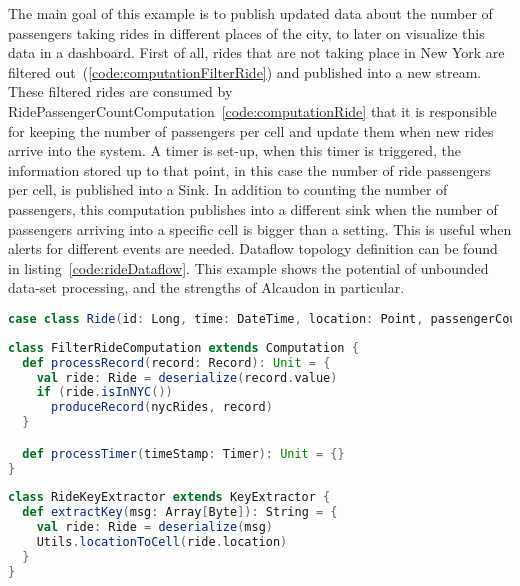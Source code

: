 The main goal of this example is to publish updated data about the number of
passengers taking rides in different places of the city, to later on visualize
this data in a dashboard. First of all, rides that are not taking place in New
York are filtered out~(\ref{code:computationFilterRide}) and published into a new
stream. These filtered rides are consumed by
RidePassengerCountComputation~\ref{code:computationRide} that it is responsible
for keeping the number of passengers per cell and update them when new rides
arrive into the system. A timer is set-up, when this timer is triggered, the
information stored up to that point, in this case the number of ride passengers
per cell, is published into a Sink. In addition to counting the number of
passengers, this computation publishes into a different sink when the number of
passengers arriving into a specific cell is bigger than a setting. This is
useful when alerts for different events are needed. Dataflow topology definition
can be found in listing~\ref{code:rideDataflow}. This example shows the
potential of unbounded data-set processing, and the strengths of Alcaudon in
particular.

\begin{lstlisting}[language=scala, frame=trBL, label=code:ride, float=ht, caption = {Ride \acs{ADT}}]
case class Ride(id: Long, time: DateTime, location: Point, passengerCount: Int)
\end{lstlisting}

\begin{lstlisting}[language=scala, frame=trBL, label=code:computationFilterRide, float=ht, caption = {Computation to filter out non New York rides}]
class FilterRideComputation extends Computation {
  def processRecord(record: Record): Unit = {
    val ride: Ride = deserialize(record.value)
    if (ride.isInNYC())
      produceRecord(nycRides, record)
  }

  def processTimer(timeStamp: Timer): Unit = {}
}
\end{lstlisting}

\begin{lstlisting}[language=scala, frame=trBL, label=code:keyExtractorNY, float=ht, caption = {Key extractor function}]
class RideKeyExtractor extends KeyExtractor {
  def extractKey(msg: Array[Byte]): String = {
    val ride: Ride = deserialize(msg)
    Utils.locationToCell(ride.location)
  }
}
\end{lstlisting}

